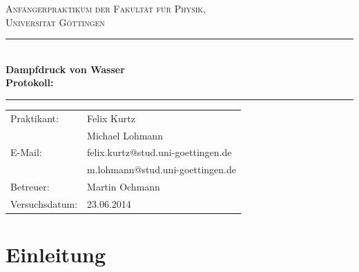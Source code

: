 \documentclass[12pt,a4paper,titlepage,headinclude,bibtotoc]{scrartcl}
\begin{document}
\begin{titlepage}
\centering
\textsc{\Large Anfängerpraktikum der Fakultät für
  Physik,\\[1.5ex] Universität Göttingen}

\vspace*{4.2cm}

\rule{\textwidth}{1pt}\\[0.5cm]
{\huge \bfseries
  Dampfdruck von Wasser\\[1.5ex]
  Protokoll:}\\[0.5cm]
\rule{\textwidth}{1pt}

\vspace*{3.0cm}

\begin{Large}
\begin{tabular}{ll}
Praktikant:
 	&  Felix Kurtz\\
 	&  Michael Lohmann\\

  E-Mail: 
	&  felix.kurtz@stud.uni-goettingen.de\\
	& m.lohmann@stud.uni-goettingen.de\\	

 Betreuer: & Martin Ochmann\\
 Versuchsdatum: & 23.06.2014\\
\end{tabular}
\end{Large}

\vspace*{0.8cm}

\begin{Large}
\end{Large}

\end{titlepage}

\tableofcontents

\newpage

\section{Einleitung}
\label{sec:einleitung}
\end{document}
